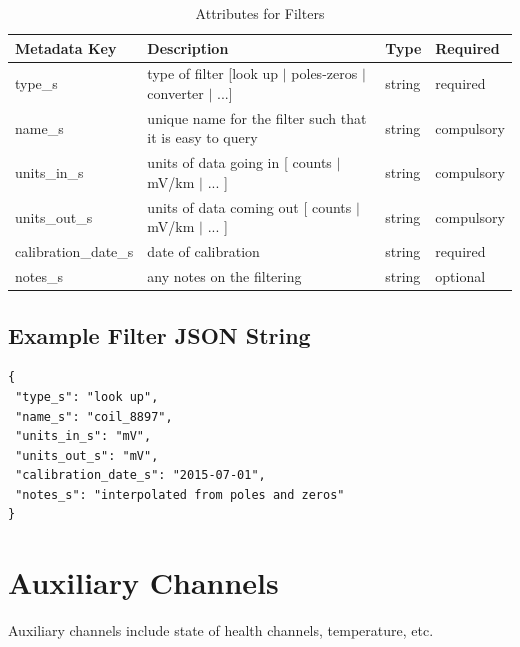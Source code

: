 \documentclass{article}
\begin{document}
\begin{table}[htb!]
	\caption[Attributes for Filter]{Attributes for Filters}
	\begin{tabular}{|l|p{3.5in}|l|l|}
		\hline
		\textbf{Metadata Key} & \textbf{Description} & \textbf{Type} & \textbf{Required} \\ \hline
		type\_s & type of filter [look up $|$ poles-zeros $|$ converter $|$ ...]& string &  required \\ \hline
		name\_s & unique name for the filter such that it is easy to query & string & compulsory \\ \hline
		units\_in\_s & units of data going in [ counts $|$ mV/km $|$ ... ] & string & compulsory \\ \hline
		units\_out\_s & units of data coming out [ counts $|$ mV/km $|$ ... ] & string & compulsory \\ \hline
		calibration\_date\_s & date of calibration & string &  required \\ \hline
		notes\_s & any notes on the filtering & string &  optional \\ \hline
	\end{tabular}
	\label{tab:filter}
\end{table}

\subsection{Example Filter JSON String} 

\begin{verbatim}
{
 "type_s": "look up",
 "name_s": "coil_8897",
 "units_in_s": "mV",
 "units_out_s": "mV",
 "calibration_date_s": "2015-07-01",
 "notes_s": "interpolated from poles and zeros"
}
\end{verbatim}

\newpage

\section{Auxiliary Channels}

Auxiliary channels include state of health channels, temperature, etc.  
\end{document}
